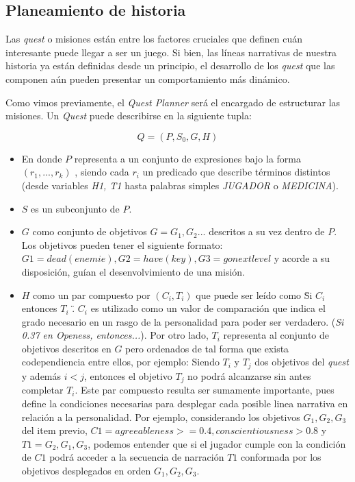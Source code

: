 \documentclass[conference]{IEEEtran}
\begin{document}
\subsection{Planeamiento de historia}

Las \textit{quest} o misiones están entre los factores cruciales que definen cuán interesante puede llegar a ser un juego. Si bien, las líneas narrativas de nuestra historia ya están definidas desde un principio, el desarrollo de los \textit{quest} que las componen aún pueden presentar un comportamiento más dinámico.

Como vimos previamente, el \textit{Quest Planner} será el encargado de estructurar las misiones. Un \textit{Quest} puede describirse en la siguiente tupla:

$$Q = (P, S_0, G, H)$$

\begin{itemize}
\item  En donde $P$ representa a un conjunto de expresiones bajo la forma $(r_1, ..., r_k)$ , siendo cada $r_i$ un predicado que describe términos distintos (desde variables \textit{H1, T1} hasta palabras simples \textit{JUGADOR} o \textit{MEDICINA}).

\item $S$ es un subconjunto de $P$.

\item $G$ como conjunto de objetivos $G = {G_1, G_2 ...}$ descritos a su vez dentro de $P$. Los objetivos pueden tener el siguiente formato: $G1 = {dead(enemie)}, G2 = {have(key)}, G3 = go{next level}$ y acorde a su disposición, guían el desenvolvimiento de una misión. 



\item $H$ como un par compuesto por $(C_i, T_i)$ que puede ser leído como \" Si $C_i$ entonces $T_i$ \". $C_i$ es utilizado como un valor de comparación que indica el grado necesario en un rasgo de la personalidad para poder  ser verdadero. (\textit{Si 0.37 en Openess, entonces...}). Por otro lado, $T_i$ representa al conjunto de objetivos descritos en $G$ pero ordenados de tal forma que exista codependiencia entre ellos, por ejemplo: Siendo $T_i$ y $T_j$ dos objetivos del \textit{quest} y además $ i < j $, entonces el objetivo $T_j$ no podrá alcanzarse sin antes completar $T_i$. Este par compuesto resulta ser sumamente importante, pues define la condiciones necesarias para desplegar cada posible linea narrativa en relación a la personalidad. Por ejemplo, considerando los objetivos $G_1, G_2, G_3$ del item previo, $C1 = {agreeableness >= 0.4, conscientiousness > 0.8}$ y $T1 = {G_2, G_1, G_3}$, podemos entender que si el jugador cumple con la condición de $C1$ podrá acceder a la secuencia de narración $T1$ conformada por los objetivos desplegados en  orden $G_1, G_2, G_3$.
 
	
\end{itemize}
\end{document}
